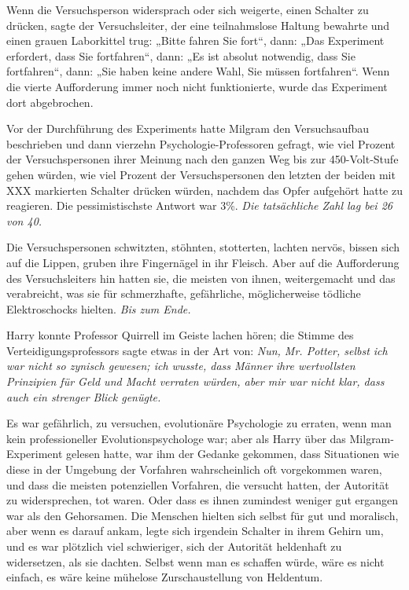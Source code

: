 {Wenn die Versuchsperson widersprach oder sich weigerte, einen Schalter zu drücken, sagte der Versuchsleiter, der eine teilnahmslose Haltung bewahrte und einen grauen Laborkittel trug: „Bitte fahren Sie fort“, dann: „Das Experiment erfordert, dass Sie fortfahren“, dann: „Es ist absolut notwendig, dass Sie fortfahren“, dann: „Sie haben keine andere Wahl, Sie müssen fortfahren“. Wenn die vierte Aufforderung immer noch nicht funktionierte, wurde das Experiment dort abgebrochen.

Vor der Durchführung des Experiments hatte Milgram den Versuchsaufbau beschrieben und dann vierzehn Psychologie-Professoren gefragt, wie viel Prozent der Versuchspersonen ihrer Meinung nach den ganzen Weg bis zur 450-Volt-Stufe gehen würden, wie viel Prozent der Versuchspersonen den letzten der beiden mit XXX markierten Schalter drücken würden, nachdem das Opfer aufgehört hatte zu reagieren. Die pessimistischste Antwort war 3\%. \emph{Die tatsächliche Zahl lag bei 26 von 40.}

Die Versuchspersonen schwitzten, stöhnten, stotterten, lachten nervös, bissen sich auf die Lippen, gruben ihre Fingernägel in ihr Fleisch. Aber auf die Aufforderung des Versuchsleiters hin hatten sie, die meisten von ihnen, weitergemacht und das verabreicht, was sie für schmerzhafte, gefährliche, möglicherweise tödliche Elektroschocks hielten. \emph{Bis zum Ende.}

Harry konnte Professor Quirrell im Geiste lachen hören; die Stimme des Verteidigungsprofessors sagte etwas in der Art von: \emph{Nun, Mr. Potter, selbst ich war nicht so zynisch gewesen; ich wusste, dass Männer ihre wertvollsten Prinzipien für Geld und Macht verraten würden, aber mir war nicht klar, dass auch ein strenger Blick genügte.}

Es war gefährlich, zu versuchen, evolutionäre Psychologie zu erraten, wenn man kein professioneller Evolutionspsychologe war; aber als Harry über das Milgram-Experiment gelesen hatte, war ihm der Gedanke gekommen, dass Situationen wie diese in der Umgebung der Vorfahren wahrscheinlich oft vorgekommen waren, und dass die meisten potenziellen Vorfahren, die versucht hatten, der Autorität zu widersprechen, tot waren. Oder dass es ihnen zumindest weniger gut ergangen war als den Gehorsamen. Die Menschen hielten sich selbst für gut und moralisch, aber wenn es darauf ankam, legte sich irgendein Schalter in ihrem Gehirn um, und es war plötzlich viel schwieriger, sich der Autorität heldenhaft zu widersetzen, als sie dachten. Selbst wenn man es schaffen würde, wäre es nicht einfach, es wäre keine mühelose Zurschaustellung von Heldentum.

}
